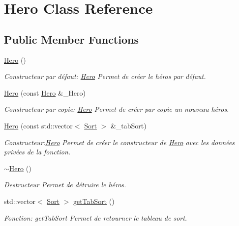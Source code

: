 \hypertarget{classHero}{}\section{Hero Class Reference}
\label{classHero}
\subsection*{Public Member Functions}
\begin{DoxyCompactItemize}
\item 
\hyperlink{classHero_ab5920677a4b5cb59d6f513922d037dca}{Hero} ()
\begin{DoxyCompactList}\small\item\em Constructeur par défaut\+: \hyperlink{classHero}{Hero} Permet de créer le héros par défaut. \end{DoxyCompactList}\item 
\hyperlink{classHero_aaf432046f7dcf546db3e24c7976e8df7}{Hero} (const \hyperlink{classHero}{Hero} \&\+\_\+\+Hero)
\begin{DoxyCompactList}\small\item\em Constructeur par copie\+: \hyperlink{classHero}{Hero} Permet de créer par copie un nouveau héros. \end{DoxyCompactList}\item 
\hyperlink{classHero_a2fab78b80b87c8aa7a45b1ba38272795}{Hero} (const std\+::vector$<$ \hyperlink{classSort}{Sort} $>$ \&\+\_\+tab\+Sort)
\begin{DoxyCompactList}\small\item\em Constructeur\+:\hyperlink{classHero}{Hero} Permet de créer le constructeur de \hyperlink{classHero}{Hero} avec les données privées de la fonction. \end{DoxyCompactList}\item 
\mbox{\label{classHero_a5aeef41ede5a80dc29c5acd7b553c4da}} 
\hyperlink{classHero_a5aeef41ede5a80dc29c5acd7b553c4da}{$\sim$\+Hero} ()
\begin{DoxyCompactList}\small\item\em Destructeur Permet de détruire le héros. \end{DoxyCompactList}\item 
std\+::vector$<$ \hyperlink{classSort}{Sort} $>$ \hyperlink{classHero_ab596535fb4e3aeb836bd23780220455b}{get\+Tab\+Sort} ()
\begin{DoxyCompactList}\small\item\em Fonction\+: get\+Tab\+Sort Permet de retourner le tableau de sort. \end{DoxyCompactList}\item 

\end{DoxyCompactItemize}
